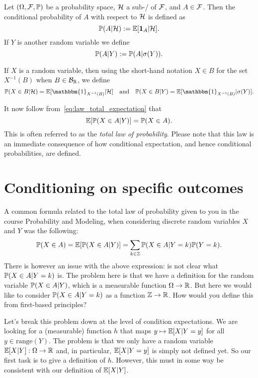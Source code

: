 \begin{definition}
Let $(\Omega, \mathcal F, \mathbb P)$ be a probability space, $\mathcal H$ a sub-\sigalg/ of $\mathcal F$, and $A \in \mathcal F$. Then the conditional probability of $A$ with respect to $\mathcal H$ is defined as
\[
	\mathbb P(A | \mathcal H) := \mathbb E[\mathbf{1}_{A} | \mathcal H].
\]
If $Y$ is another random variable we define
\[
	\mathbb P(A | Y) := \mathbb P( A | \sigma(Y)).
\]
\end{definition}

If $X$ is a random variable, then using the short-hand notation $X \in B$ for the set $X^{-1}(B)$ when $B \in \mathcal B_{\mathbb R}$, we define
\begin{equation}
	\bbP(X \in B | \cH) = \bbE[\mathbbm{1}_{X^{-1}(B)} | \cH] \quad \text{and} \quad
	\bbP(X \in B | Y) = \bbE[\mathbbm{1}_{X^{-1}(B)} | \sigma(Y)].
\end{equation}

It now follow from~\eqref{eq:law_total_expectation} that
\[
	\mathbb E[\mathbb P(X \in A | Y)] = \mathbb P(X \in A).
\]
This is often referred to as the \emph{total law of probability}. Please note that this law is an immediate consequence of how conditional expectation, and hence conditional probabilities, are defined.



\section{Conditioning on specific outcomes}

A common formula related to the total law of probability given to you in the course Probability and Modeling, when considering discrete random variables $X$ and $Y$ was the following:
\begin{equation}\label{eq:law_of_probability_discrete}
	\mathbb P(X \in A) = \mathbb E[\mathbb P(X \in A | Y)] = \sum_{k \in \mathbb Z} \mathbb P(X \in A | Y= k) \mathbb P(Y = k). 
\end{equation}
There is however an issue with the above expression: is not clear what $\mathbb P(X \in A | Y = k)$ is. The problem here is that we have a definition for the random variable $\mathbb P(X \in A | Y)$, which is a measurable function $\Omega \to \mathbb R$. But here we would like to consider $\mathbb P(X \in A | Y = k)$ as a function $\mathbb Z \to \mathbb R$. How would you define this from first-based principles?

Let's break this problem down at the level of condition expectations. We are looking for a (measurable) function $h$ that maps $y \mapsto \mathbb E[X | Y = y]$ for all $y \in \mathrm{range}(Y)$. The problem is that we only have a random variable $\mathbb E[X |Y] : \Omega \to \mathbb R$ and, in particular, $\mathbb E[X | Y = y]$ is simply not defined yet. So our first task is to give a definition of $h$. However, this must in some way be consistent with our definition of $\mathbb E[X|Y]$.  

